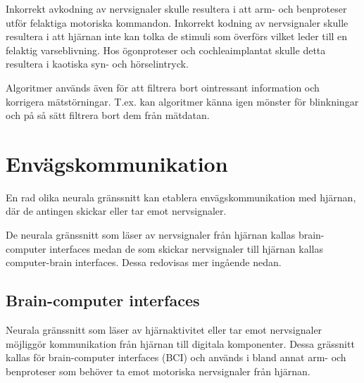 \documentclass[12pt, a4paper]{article}
\begin{document}
Inkorrekt avkodning av nervsignaler skulle resultera i att arm- och benproteser
utför felaktiga motoriska kommandon. Inkorrekt kodning av nervsignaler skulle
resultera i att hjärnan inte kan tolka de stimuli som överförs vilket leder till
en felaktig varseblivning. Hos ögonproteser och cochleaimplantat skulle detta
resultera i kaotiska syn- och hörselintryck.



Algoritmer används även för att filtrera bort ointressant information och
korrigera mätstörningar. T.ex. kan algoritmer känna igen mönster för blinkningar
och på så sätt filtrera bort dem från mätdatan.


\section{Envägskommunikation}

En rad olika neurala gränssnitt kan etablera envägskommunikation med hjärnan,
där de antingen skickar eller tar emot nervsignaler.

De neurala gränssnitt som läser av nervsignaler från hjärnan kallas
brain-computer interfaces medan de som skickar nervsignaler till hjärnan kallas
computer-brain interfaces. Dessa redovisas mer ingående nedan.



\subsection{Brain-computer interfaces}

Neurala gränssnitt som läser av hjärnaktivitet eller tar emot nervsignaler
möjliggör kommunikation från hjärnan till digitala komponenter. Dessa grässnitt
kallas för brain-computer interfaces (BCI) och används i bland annat arm- och
benproteser som behöver ta emot motoriska nervsignaler från hjärnan.
\end{document}
